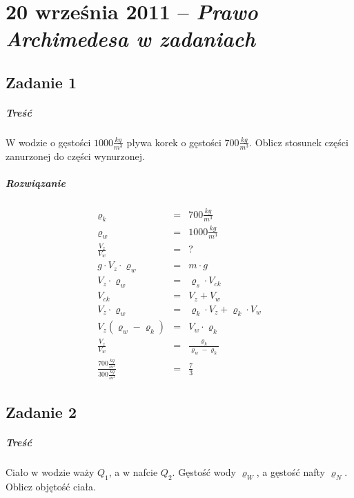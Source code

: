 \documentclass [a4paper, 11pt, oneside]{book}
\begin{document}
\chapter{20 września 2011 -- \textit{Prawo Archimedesa w zadaniach}} %
\label{cha:20_wrze_nia_2011_textit}
	\section{Zadanie 1} %
	\label{sec:zadanie_1}
		\paragraph{Treść}W wodzie o gęstości $1000\frac{kg}{m^3}$ pływa korek o gęstości $700\frac{kg}{m^3}$. Oblicz stosunek części zanurzonej do części wynurzonej.
		\paragraph{Rozwiązanie}
		\begin{eqnarray*}
			\varrho_k &=& 700\frac{kg}{m^3}\\
			\varrho_w &=& 1000\frac{kg}{m^3}\\
			\frac{V_z}{V_w} & = & ?\\
			g\cdot V_z \cdot \varrho_w &=& m\cdot g\\
			V_z\cdot \varrho_w &=& \varrho_s \cdot V_{ck}\\
			V_{ck} &=& V_z+V_w\\
			V_z\cdot \varrho_w &=& \varrho_k \cdot V_z + \varrho_k\cdot V_w\\
			V_z(\varrho_w-\varrho_k) &=& V_w\cdot\varrho_k\\
			\frac{V_z}{V_w} &=& \frac{\varrho_k}{\varrho_w-\varrho_k}\\
			\frac{700\frac{kg}{m^3}}{300\frac{kg}{m^3}} &=& \frac73
		\end{eqnarray*}
	\section{Zadanie 2} %
	\label{sec:zadanie_2}
		\paragraph{Treść}Ciało w wodzie waży $Q_1$, a w nafcie $Q_2$. Gęstość wody $\varrho_W$, a gęstość nafty $\varrho_N$. Oblicz objętość ciała.
\end{document}
